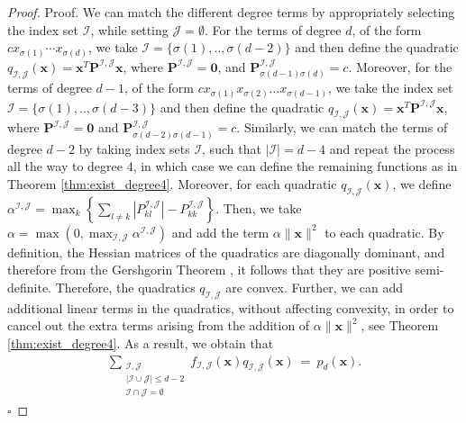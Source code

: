 \documentclass[opre,nonblindrev]{informs3} %
\begin{document}
{\begin{proof}{Proof. }
We can match the different degree terms by appropriately selecting the index set $\mathcal{I}$, while setting $\mathcal{J} = \emptyset$. For the terms of degree $d$, of the form $cx_{\sigma(1)} \cdots x_{\sigma(d)}$, we take $\mathcal{I} = \{\sigma(1),..,\sigma(d-2)\}$ and then define the quadratic $q_{\mathcal{I},\mathcal{J}}(\boldsymbol{x}) = \boldsymbol{x}^T \boldsymbol{P}^{\mathcal{I},\mathcal{J}}\boldsymbol{x}$, where $\boldsymbol{P}^{\mathcal{I},\mathcal{J}} = \boldsymbol{0}$, and $\boldsymbol{P}^{\mathcal{I},\mathcal{J}}_{\sigma(d-1) \sigma(d)} = c$. Moreover, for the terms of degree $d-1$, of the form $cx_{\sigma(1)} x_{\sigma(2)}...x_{\sigma(d-1)}$, we take the index set $\mathcal{I} = \{\sigma(1),..,\sigma(d-3)\}$ and then define the quadratic $q_{\mathcal{I},\mathcal{J}}(\boldsymbol{x}) = \boldsymbol{x}^T \boldsymbol{P}^{\mathcal{I},\mathcal{J}}\boldsymbol{x}$, where $\boldsymbol{P}^{\mathcal{I},\mathcal{J}} = \boldsymbol{0}$ and $\boldsymbol{P}^{\mathcal{I},\mathcal{J}}_{\sigma(d-2) \sigma(d-1)} = c$. Similarly, we can match the terms of degree $d-2$ by taking index sets $\mathcal{I}$, such that $|\mathcal{I}| = d-4$ and repeat the process all the way to degree $4$, in which case we can define the remaining functions as in Theorem \ref{thm:exist_degree4}. Moreover, for each quadratic $q_{\mathcal{I},\mathcal{J}}(\boldsymbol{x})$, we define $\alpha^{\mathcal{I},\mathcal{J}} = \max_k \left\{ \sum_{l \neq k} |P_{kl}^{\mathcal{I},\mathcal{J}}| - P_{kk}^{\mathcal{I},\mathcal{J}} \right\}$. Then, we take $\alpha = \max \left(0, \max_{\mathcal{I},\mathcal{J}} \alpha^{\mathcal{I},\mathcal{J}} \right)$ and add the term $\alpha \|\boldsymbol{x}\|^2$ to each quadratic. By definition, the Hessian matrices of the quadratics are diagonally dominant, and therefore from the Gershgorin Theorem \cite{gershgorin1931uber}, it follows that they are positive semi-definite. Therefore, the quadratics $q_{\mathcal{I},\mathcal{J}}$ are convex. Further, we can add additional linear terms in the quadratics, without affecting convexity, in order to cancel out the extra terms arising from the addition of $\alpha\|\boldsymbol{x}\|^2$, see Theorem \ref{thm:exist_degree4}. As a result, we obtain that
\begin{align*}
   \sum_{\substack{\mathcal{I}, \mathcal{J} \\ |\mathcal{I} \cup \mathcal{J}| \leq d-2 \\ \mathcal{I} \cap \mathcal{J} = \emptyset}} f_{\mathcal{I},\mathcal{J}}(\boldsymbol{x}) q_{\mathcal{I},\mathcal{J}}(\boldsymbol{x})  \: = \: p_d(\boldsymbol{x}).
\end{align*} \hfill $\square$   
\end{proof}  

}
\end{document}
